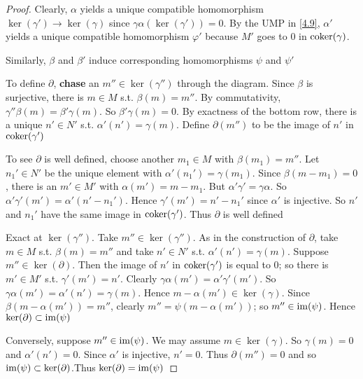 \documentclass[11pt]{article}
\begin{document}
\begin{proof}
Clearly, \(\alpha\) yields a unique compatible homomorphism
\(\ker(\gamma')\to\ker(\gamma)\) since \(\gamma\alpha(\ker(\gamma'))=0\). By the
UMP in \ref{4.9}, \(\alpha'\) yields a unique compatible homomorphism \(\varphi'\) because
\(M'\) goes to 0 in \(\operatorname{coker}(\gamma)\).
\begin{center}
\end{center}
Similarly, \(\beta\) and \(\beta'\) induce corresponding homomorphisms \(\psi\) and
\(\psi'\)

To define \(\partial\), \textbf{chase} an \(m''\in\ker(\gamma'')\) through the
diagram. Since  \(\beta\) is surjective, there is \(m\in M\) s.t. \(\beta(m)=m''\). By
commutativity, \(\gamma''\beta(m)=\beta'\gamma(m)\). So
\(\beta'\gamma(m)=0\). By exactness of the bottom row, there is a unique
\(n'\in N'\) s.t. \(\alpha'(n')=\gamma(m)\). Define \(\partial(m'')\) to be the
image of \(n'\) in \(\operatorname{coker}(\gamma')\)

To see \(\partial\) is well defined, choose another \(m_1\in M\) with
\(\beta(m_1)=m''\).  Let \(n_1'\in N'\) be the unique element with
\(\alpha'(n_1')=\gamma(m_1)\). Since \(\beta(m-m_1)=0\), there is an \(m'\in M'\)
with \(\alpha(m')=m-m_1\). But \(\alpha'\gamma'=\gamma\alpha\). So
\(\alpha'\gamma'(m')=\alpha'(n'-n_1')\). Hence \(\gamma'(m')=n'-n_1'\) since
\(\alpha'\) is injective. So \(n'\) and \(n_1'\) have the same image in
\(\operatorname{coker}(\gamma')\). Thus \(\partial\) is well defined

Exact at \(\ker(\gamma'')\). Take \(m''\in\ker(\gamma'')\). As in the
construction of \(\partial\), take \(m\in M\) s.t. \(\beta(m)=m''\) and take
\(n'\in N'\) s.t. \(\alpha'(n')=\gamma(m)\). Suppose \(m''\in\ker(\partial)\). Then
the image of \(n'\) in \(\operatorname{coker}(\gamma')\) is equal to 0; so there is \(m'\in
   M'\) s.t. \(\gamma'(m')=n'\). Clearly
\(\gamma\alpha(m')=\alpha'\gamma'(m')\). So
\(\gamma\alpha(m')=\alpha'(n')=\gamma(m)\). Hence \(m-\alpha(m')\in\ker(\gamma)\).
Since \(\beta(m-\alpha(m'))=m''\), clearly \(m''=\psi(m-\alpha(m'))\); so
\(m''\in\operatorname{im}(\psi)\). Hence \(\ker(\partial)\subset\operatorname{im}(\psi)\)

Conversely, suppose \(m''\in\operatorname{im}(\psi)\). We may assume \(m\in\ker(\gamma)\). So
\(\gamma(m)=0\) and \(\alpha'(n')=0\). Since \(\alpha'\) is injective, \(n'=0\).
Thus \(\partial(m'')=0\) and so \(\operatorname{im}(\psi)\subset\ker(\partial)\).Thus \(\ker(\partial)=\operatorname{im}(\psi)\)
\end{proof}
\end{document}
